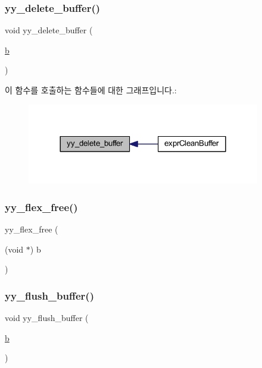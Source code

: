 \subsubsection{\texorpdfstring{yy\+\_\+delete\+\_\+buffer()}{yy\_delete\_buffer()}}
{\footnotesize\ttfamily void yy\+\_\+delete\+\_\+buffer (\begin{DoxyParamCaption}\item[{\mbox{\hyperlink{expr-lex_8cpp_a91b64995742fd30063314f12340b4b5a}{b}}}]{ }\end{DoxyParamCaption})}

이 함수를 호출하는 함수들에 대한 그래프입니다.\+:
\nopagebreak
\begin{figure}[H]
\begin{center}
\leavevmode
\includegraphics[width=288pt]{expr-lex_8cpp_a05a39a25571bbcfcf45a1e04a8c24f9b_icgraph}
\end{center}
\end{figure}
\mbox{\label{expr-lex_8cpp_a8eaf742e61b43d25af0aa73d14d6a4ae}} 
\subsubsection{\texorpdfstring{yy\+\_\+flex\+\_\+free()}{yy\_flex\_free()}}
{\footnotesize\ttfamily yy\+\_\+flex\+\_\+free (\begin{DoxyParamCaption}\item[{(void $\ast$)}]{b }\end{DoxyParamCaption})}

\mbox{\label{expr-lex_8cpp_aaad521488306a55a775adfe38ce4cf49}} 
\subsubsection{\texorpdfstring{yy\+\_\+flush\+\_\+buffer()}{yy\_flush\_buffer()}}
{\footnotesize\ttfamily void yy\+\_\+flush\+\_\+buffer (\begin{DoxyParamCaption}\item[{\mbox{\hyperlink{expr-lex_8cpp_a91b64995742fd30063314f12340b4b5a}{b}}}]{ }\end{DoxyParamCaption})}

